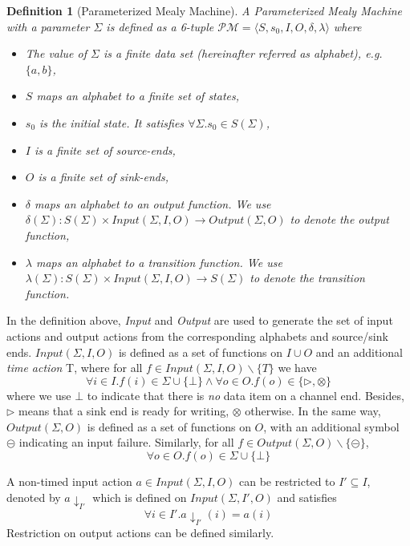 \documentclass[conference, a4paper]{IEEEtran}
\newtheorem{definition}{Definition}
\newcommand{\rblock}[0]{\circleddash}
\newcommand{\rread}[0]{\rhd}
\newcommand{\rnoread}[0]{\otimes}
\begin{document}
\begin{definition}[Parameterized Mealy Machine]
  A \emph{Parameterized Mealy Machine} with a parameter $\Sigma$ is defined as a 6-tuple
  $\mathcal{PM}=\langle S, s_0, I, O, \delta, \lambda\rangle$ where 
  \begin{itemize}
    \item[-] The value of $\Sigma$ is a \emph{finite} data set (hereinafter referred as
      alphabet), e.g.  $\{a,b\}$,
    \item[-] $S$ maps an alphabet to a \emph{finite} set of states,
    \item[-] $s_0$ is the initial state. It satisfies $\forall \Sigma.s_0\in S(\Sigma)$,
    \item[-] $I$ is a finite set of source-ends,
    \item[-] $O$ is a finite set of sink-ends,
    \item[-] $\delta$ maps an alphabet to an \emph{output function}. We use
      $\delta(\Sigma):S(\Sigma)\times Input(\Sigma,I,O)\rightarrow Output(\Sigma,O)$ to denote the
      output function,
    \item[-] $\lambda$ maps an alphabet to a \emph{transition function}. We use
      $\lambda(\Sigma):S(\Sigma)\times Input(\Sigma,I,O)\rightarrow S(\Sigma)$ to denote the
      transition function.
  \end{itemize}
\end{definition}

In the definition above, \emph{Input} and \emph{Output} are used to generate the set of input actions
and output actions from the corresponding alphabets and source/sink ends. $Input(\Sigma,I,O)$ is
defined as a set of functions on $I\cup O$ and an additional \emph{time action} T,  
where for all $f\in Input(\Sigma,I,O)\backslash \{T\}$ we have
\[
\forall i\in I.f(i)\in \Sigma\cup\{\bot\}\land \forall o\in O.f(o)\in\{\rread, \rnoread\}
\]
where we use $\bot$ to indicate that there is \emph{no} data item on a channel end. 
Besides, $\rread$ means that a sink end is ready for writing, $\rnoread$ otherwise. 
In the same way,
$Output(\Sigma,O)$ is defined as a set of functions on $O$, with an additional symbol
$\rblock$ indicating an input failure. Similarly, for all $f\in
Output(\Sigma,O)\backslash\{\rblock\}$,
\[
\forall o\in O. f(o)\in \Sigma\cup\{\bot\}
\]

A non-timed input action $a\in Input(\Sigma,I,O)$ can be restricted to $I'\subseteq I$, denoted by
$a\downarrow_{I'}$ which is defined on $Input(\Sigma,I',O)$ and satisfies
\[
\forall i\in I'. a\downarrow_{I'}(i)=a(i)
\]
Restriction on output actions can be defined similarly.
\end{document}
